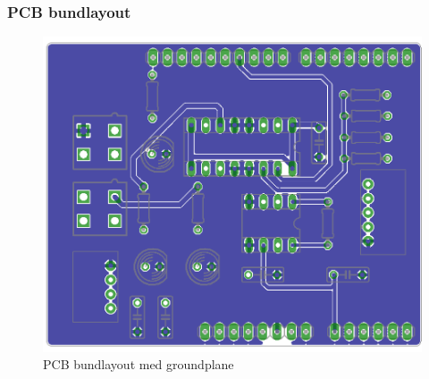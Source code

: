 \subsubsection{PCB bundlayout}

\begin{figure}[H]
	\centering
	\includegraphics[width=1\textwidth]{billeder/hardware/Bundlayout.png}
	\caption{PCB bundlayout med groundplane}
	\label{fig:PCBbundlayout}
\end{figure}

